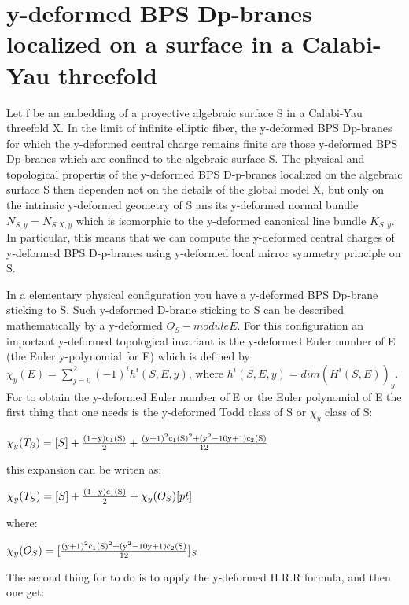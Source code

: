 \documentclass[a4paper,a4paper]{article}
\begin{document}
\section{y-deformed BPS Dp-branes localized on a surface in a Calabi-Yau
threefold}

Let f be an embedding of a proyective algebraic surface S in a Calabi-Yau threefold X. In the limit of infinite elliptic fiber, the y-deformed BPS Dp-branes  for which the y-deformed central charge remains  finite are those y-deformed BPS Dp-branes which are confined to the algebraic surface S. The physical and topological propertis of the y-deformed BPS D-p-branes  localized on the algebraic surface S then dependen not on the details of the
global model X, but only on the intrinsic y-deformed  geometry of S ans its y-deformed normal bundle $N_{S,y}=N_{S|X,y}$ which is isomorphic to the y-deformed canonical line bundle $K_{S,y}$. In particular, this means that we can compute the y-deformed central charges of y-deformed BPS D-p-branes using y-deformed local mirror symmetry principle on S.

In a elementary physical configuration you have a y-deformed BPS Dp-brane sticking to S.  Such y-deformed  D-brane sticking to S can be described mathematically by a y-deformed $O_{S}-module E$. For this configuration an important y-deformed topological invariant is the y-deformed Euler number of E (the Euler y-polynomial for E) which is defined by  ${\chi}_{y}(E)=\sum_{j=0}^{2}(-1)^ih^i(S,E,y)$, where $h^i(S,E,y)=dim(H^i(S,E))_y$.
For to obtain the y-deformed Euler number of E or the Euler  polynomial of E
the first thing that one needs is the y-deformed Todd class of S or ${\chi}_y  $ class of S:

\begin{center}
{  $ {\chi}_y(T_S) = [S]+\frac{\rm (1-y)c_1(S)}{\rm 2}+\frac{\rm (y+1)^2c_1(S)^2+(y^2-10y+1)c_2(S)}{\rm 12} $ }
\end{center}

this expansion can be writen as:

\begin{center}
{  $ {\chi}_y(T_S) = [S]+\frac{\rm (1-y)c_1(S)}{\rm 2}+{\chi}_{y}(O_S)[pt] $ }
\end{center}
where:

\begin{center}
{  $ {\chi}_{y}(O_S) = [\frac{\rm (y+1)^2c_1(S)^2+(y^2-10y+1)c_2(S)}{\rm 12} ]_S$ }

\end{center}
 The second thing for to do is to apply the y-deformed H.R.R formula, and then one get:
\end{document}
